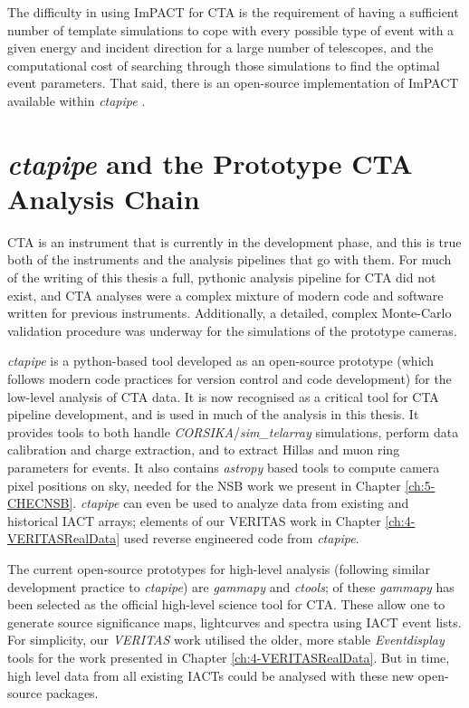 The difficulty in using ImPACT for CTA is the requirement of having a sufficient number of template simulations to cope with every possible type of event with a given energy and incident direction for a large number of telescopes, and the computational cost of searching through those simulations to find the optimal event parameters. That said, there is an open-source implementation of ImPACT available within \textit{ctapipe} \cite{ctapipe,ctapipe2}.

\section{\textit{ctapipe} and the Prototype CTA Analysis Chain}

CTA is an instrument that is currently in the development phase, and this is true both of the instruments and the analysis pipelines that go with them. For much of the writing of this thesis a full, pythonic analysis pipeline for CTA did not exist, and CTA analyses were a complex mixture of modern code and software written for previous instruments. Additionally, a detailed, complex Monte-Carlo validation procedure was underway for the simulations of the prototype cameras.

\textit{ctapipe} is a python-based tool developed as an open-source prototype (which follows modern code practices for version control and code development) for the low-level analysis of CTA data. It is now recognised as a critical tool for CTA pipeline development, and is used in much of the analysis in this thesis. It provides tools to both handle \textit{CORSIKA}/\textit{sim\_telarray} simulations, perform data calibration and charge extraction, and to extract Hillas and muon ring parameters for events. It also contains \textit{astropy} based tools to compute camera pixel positions on sky, needed for the NSB work we present in Chapter \ref{ch:5-CHECNSB}. \textit{ctapipe} can even be used to analyze data from existing and historical IACT arrays; elements of our VERITAS work in Chapter \ref{ch:4-VERITASRealData} used reverse engineered code from \textit{ctapipe}.

The current open-source prototypes for high-level analysis (following similar development practice to \textit{ctapipe}) are \textit{gammapy} and \textit{ctools}; of these \textit{gammapy} has been selected as the official high-level science tool for CTA. These allow one to generate source significance maps, lightcurves and spectra using IACT event lists. For simplicity, our \textit{VERITAS} work utilised the older, more stable \textit{Eventdisplay} tools for the work presented in Chapter \ref{ch:4-VERITASRealData}. But in time, high level data from all existing IACTs could be analysed with these new open-source packages.

